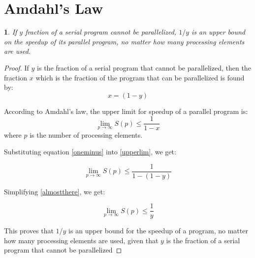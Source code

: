 \documentclass[letterpaper]{article}
\newtheorem{thm}{}
\begin{document}
\section{Amdahl's Law}
\label{sec:orgcb7e584}

\begin{thm}
    If \(y\) fraction of a serial program cannot be parallelized, \(1/y\) is an upper bound on the speedup of its parallel program, no matter how many processing elements are used.
\end{thm}

\begin{proof}
If \(y\) is the fraction of a serial program that cannot be parallelized, then the fraction \(x\) which is the fraction of the program that can be parallelized is found by:
\begin{equation}\label{oneminus}
x =  (1-y)
\end{equation}

According to Amdahl's law, the upper limit for speedup of a parallel program is:
\begin{equation}\label{upperlim}
\lim_{p \to \infty} S(p) \leq \frac{1}{1-x}
\end{equation}
where \(p\) is the number of processing elements.

Substituting equation \ref{oneminus} into \ref{upperlim}, we get:

\begin{equation}\label{almostthere}
\lim_{p \to \infty} S(p) \leq \frac{1}{1-(1-y)}
\end{equation}

Simplifying \ref{almostthere}, we get:

\begin{equation}
\lim_{p \to \infty} S(p) \leq \frac{1}{y}
\end{equation}

This proves that \(1/y\) is an upper bound for the speedup of a program, no matter how many processing elements are used, given that \(y\) is the fraction of a serial program that cannot be parallelized
\end{proof}
\end{document}
